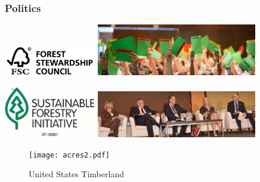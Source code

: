 \documentclass[10pt]{beamer}
\begin{document}
\begin{frame}
\frametitle{Politics}
\includegraphics[width = 4cm]{fsclogo}   
\includegraphics[width = 7cm]{fscvote} \pause

\includegraphics[width = 4cm]{sfilogo}   
\includegraphics[width = 7cm]{sficon}
\end{frame}

\begin{frame}
\begin{figure}[h!]
\centering
\caption{United States Timberland}
\label{acres}
\centering
\texttt{[image: acres2.pdf]}
\centering
\footnotesize


\end{figure}
\end{frame}
\end{document}
